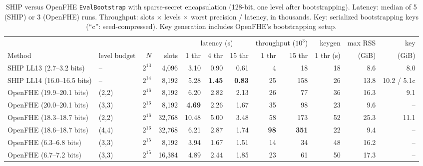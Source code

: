 \documentclass[sigconf,nonacm]{acmart}
\begin{document}
\begin{table}[t]
\caption{SHIP versus OpenFHE \texttt{EvalBootstrap} with sparse-secret encapsulation (128-bit, one level after bootstrapping). Latency: median of 5 (SHIP) or 3 (OpenFHE) runs. Throughput: slots $\times$ levels $\times$ worst precision / latency, in thousands. Key: serialized bootstrapping keys (``c'': seed-compressed). Key generation includes OpenFHE's bootstrapping setup.}
\label{tab:compare}
\small
\begin{tabular}{llrrrrrrrrrr}
\toprule
 & & & & \multicolumn{3}{c}{latency (s)} & \multicolumn{2}{c}{throughput ($10^3$)} & keygen & max RSS & key \\
\cmidrule(lr){5-7}\cmidrule(lr){8-9}
Method & level budget & $N$ & slots & 1 thr & 4 thr & 15 thr & 1 thr & 15 thr & 1 thr (s) & (GiB) & (GiB) \\
\midrule
SHIP LL13 (2.7--3.2 bits) & -- & $2^{13}$ & 4{,}096 & 3.10 & 0.90 & 0.61 & 4 & 18 & 18 & 8.6 & 8.0 \\
SHIP LL14 (16.0--16.5 bits) & -- & $2^{14}$ & 8{,}192 & 5.28 & \textbf{1.45} & \textbf{0.83} & 25 & 158 & 26 & 13.8 & 10.2 / 5.1c \\
\midrule
OpenFHE (19.9--20.1 bits) & (2,2) & $2^{16}$ & 8{,}192 & 6.20 & 2.82 & 2.13 & 26 & 77 & 36 & 16.3 & 9.1 \\
OpenFHE (20.0--20.1 bits) & (3,3) & $2^{16}$ & 8{,}192 & \textbf{4.69} & 2.26 & 1.67 & 35 & 98 & 23 & 9.6 & -- \\
OpenFHE (18.3--18.7 bits) & (2,2) & $2^{16}$ & 32{,}768 & 10.48 & 5.00 & 3.48 & 58 & 173 & 52 & 25.3 & 11.1 \\
OpenFHE (18.6--18.7 bits) & (4,4) & $2^{16}$ & 32{,}768 & 6.21 & 2.87 & 1.74 & \textbf{98} & \textbf{351} & 22 & 9.4 & -- \\
OpenFHE (6.3--6.8 bits) & (3,3) & $2^{15}$ & 8{,}192 & 3.94 & 1.67 & 1.51 & 14 & 34 & 48 & 16.2 & -- \\
OpenFHE (6.7--7.2 bits) & (3,3) & $2^{15}$ & 16{,}384 & 4.89 & 2.44 & 1.85 & 23 & 61 & 50 & 17.3 & -- \\
\bottomrule
\end{tabular}
\end{table}
\end{document}
